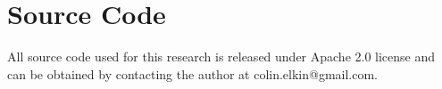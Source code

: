 \documentclass[12pt]{uthesis-v12}  %
\begin{document}
\renewcommand{\bibpreamble}{\vskip1.10cm}
 




\appendix

\chapter{Source Code}

All source code used for this research is released under Apache 2.0 license and can be obtained by contacting the author at colin.elkin@gmail.com.


\end{document}
